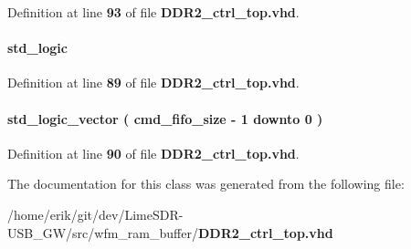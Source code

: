 Definition at line {\bf 93} of file {\bf D\+D\+R2\+\_\+ctrl\+\_\+top.\+vhd}.

\paragraph[{wcmdfifo\+\_\+wrfull}]{ {\bfseries \textcolor{comment}{std\+\_\+logic}\textcolor{vhdlchar}{ }} \hspace{0.3cm}{\ttfamily [Signal]}}\label{classDDR2__ctrl__top_1_1arch_ae70267282e5ea4b0567b3ebec6cf90c6}


Definition at line {\bf 89} of file {\bf D\+D\+R2\+\_\+ctrl\+\_\+top.\+vhd}.

\paragraph[{wcmdfifo\+\_\+wrusedw}]{ {\bfseries \textcolor{comment}{std\+\_\+logic\+\_\+vector}\textcolor{vhdlchar}{ }\textcolor{vhdlchar}{(}\textcolor{vhdlchar}{ }\textcolor{vhdlchar}{ }\textcolor{vhdlchar}{ }\textcolor{vhdlchar}{ }{\bfseries {\bf cmd\+\_\+fifo\+\_\+size}} \textcolor{vhdlchar}{-\/}\textcolor{vhdlchar}{ } \textcolor{vhdldigit}{1} \textcolor{vhdlchar}{ }\textcolor{keywordflow}{downto}\textcolor{vhdlchar}{ }\textcolor{vhdlchar}{ } \textcolor{vhdldigit}{0} \textcolor{vhdlchar}{ }\textcolor{vhdlchar}{)}\textcolor{vhdlchar}{ }} \hspace{0.3cm}{\ttfamily [Signal]}}\label{classDDR2__ctrl__top_1_1arch_adb543bd877e6a96370865a05b1ba0753}


Definition at line {\bf 90} of file {\bf D\+D\+R2\+\_\+ctrl\+\_\+top.\+vhd}.



The documentation for this class was generated from the following file\+:\begin{DoxyCompactItemize}
\item 
/home/erik/git/dev/\+Lime\+S\+D\+R-\/\+U\+S\+B\+\_\+\+G\+W/src/wfm\+\_\+ram\+\_\+buffer/{\bf D\+D\+R2\+\_\+ctrl\+\_\+top.\+vhd}\end{DoxyCompactItemize}
